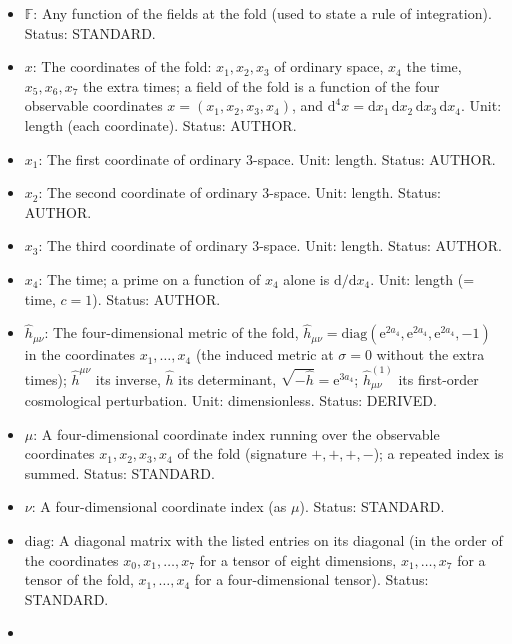 \documentclass[
  10pt,
]{article}
\begin{document}
\begin{itemize}
  \(\mathrm{e}^{-a_4}b_4\) is constant; it converts the
  eight-dimensional normalisation into the four-dimensional one. Unit:
  length\(^3\) (GeV\(^{-3}\)). Status: ASSUMED.
\item
  \(\mathbb{F}\): Any function of the fields at the fold (used to state
  a rule of integration). Status: STANDARD.
\item
  \(x\): The coordinates of the fold: \(x_1, x_2, x_3\) of ordinary
  space, \(x_4\) the time, \(x_5, x_6, x_7\) the extra times; a field of
  the fold is a function of the four observable coordinates
  \(x = (x_1, x_2, x_3, x_4)\), and
  \(\mathrm{d}^4x = \mathrm{d}x_1\,\mathrm{d}x_2\,\mathrm{d}x_3\,\mathrm{d}x_4\).
  Unit: length (each coordinate). Status: AUTHOR.
\item
  \(x_1\): The first coordinate of ordinary 3-space. Unit: length.
  Status: AUTHOR.
\item
  \(x_2\): The second coordinate of ordinary 3-space. Unit: length.
  Status: AUTHOR.
\item
  \(x_3\): The third coordinate of ordinary 3-space. Unit: length.
  Status: AUTHOR.
\item
  \(x_4\): The time; a prime on a function of \(x_4\) alone is
  \(\mathrm{d}/\mathrm{d}x_4\). Unit: length (= time, \(c = 1\)).
  Status: AUTHOR.
\item
  \(\hat h_{\mu\nu}\): The four-dimensional metric of the fold,
  \(\hat h_{\mu\nu} = \mathrm{diag}(\mathrm{e}^{2a_4}, \mathrm{e}^{2a_4}, \mathrm{e}^{2a_4}, -1)\)
  in the coordinates \(x_1, \dots, x_4\) (the induced metric at
  \(\sigma = 0\) without the extra times); \(\hat h^{\mu\nu}\) its
  inverse, \(\hat h\) its determinant,
  \(\sqrt{-\hat h} = \mathrm{e}^{3a_4}\); \(\hat h^{(1)}_{\mu\nu}\) its
  first-order cosmological perturbation. Unit: dimensionless. Status:
  DERIVED.
\item
  \(\mu\): A four-dimensional coordinate index running over the
  observable coordinates \(x_1, x_2, x_3, x_4\) of the fold (signature
  \(+,+,+,-\)); a repeated index is summed. Status: STANDARD.
\item
  \(\nu\): A four-dimensional coordinate index (as \(\mu\)). Status:
  STANDARD.
\item
  \(\mathrm{diag}\): A diagonal matrix with the listed entries on its
  diagonal (in the order of the coordinates \(x_0, x_1, \dots, x_7\) for
  a tensor of eight dimensions, \(x_1, \dots, x_7\) for a tensor of the
  fold, \(x_1, \dots, x_4\) for a four-dimensional tensor). Status:
  STANDARD.
\item

\end{itemize}
\end{document}
